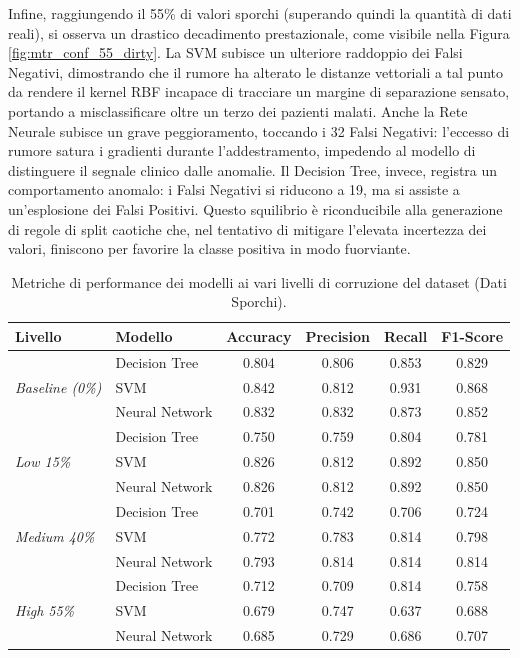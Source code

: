\documentclass[12pt]{article}
\begin{document}
Infine, raggiungendo il 55\% di valori sporchi (superando quindi la quantità di dati reali), si osserva un drastico decadimento prestazionale, come visibile nella Figura \ref{fig:mtr_conf_55_dirty}. La SVM subisce un ulteriore raddoppio dei Falsi Negativi, dimostrando che il rumore ha alterato le distanze vettoriali a tal punto da rendere il kernel RBF incapace di tracciare un margine di separazione sensato, portando a misclassificare oltre un terzo dei pazienti malati. Anche la Rete Neurale subisce un grave peggioramento, toccando i 32 Falsi Negativi: l'eccesso di rumore satura i gradienti durante l'addestramento, impedendo al modello di distinguere il segnale clinico dalle anomalie. Il Decision Tree, invece, registra un comportamento anomalo: i Falsi Negativi si riducono a 19, ma si assiste a un'esplosione dei Falsi Positivi. Questo squilibrio è riconducibile alla generazione di regole di split caotiche che, nel tentativo di mitigare l'elevata incertezza dei valori, finiscono per favorire la classe positiva in modo fuorviante.\\


\begin{table}[ht]
\centering
\begin{tabular}{llcccc}
\toprule
\textbf{Livello} & \textbf{Modello} & \textbf{Accuracy} & \textbf{Precision} & \textbf{Recall} & \textbf{F1-Score} \\
\midrule
\multirow{3}{*}{\textit{Baseline (0\%)}} & Decision Tree  & 0.804 & 0.806 & 0.853 & 0.829 \\
                                         & SVM            & 0.842 & 0.812 & 0.931 & 0.868 \\
                                         & Neural Network & 0.832 & 0.832 & 0.873 & 0.852 \\
\midrule
\multirow{3}{*}{\textit{Low 15\%}}       & Decision Tree  & 0.750 & 0.759 & 0.804 & 0.781 \\
                                         & SVM            & 0.826 & 0.812 & 0.892 & 0.850 \\
                                         & Neural Network & 0.826 & 0.812 & 0.892 & 0.850 \\
\midrule
\multirow{3}{*}{\textit{Medium 40\%}}    & Decision Tree  & 0.701 & 0.742 & 0.706 & 0.724 \\
                                         & SVM            & 0.772 & 0.783 & 0.814 & 0.798 \\
                                         & Neural Network & 0.793 & 0.814 & 0.814 & 0.814 \\
\midrule
\multirow{3}{*}{\textit{High 55\%}}      & Decision Tree  & 0.712 & 0.709 & 0.814 & 0.758 \\
                                         & SVM            & 0.679 & 0.747 & 0.637 & 0.688 \\
                                         & Neural Network & 0.685 & 0.729 & 0.686 & 0.707 \\
\bottomrule
\end{tabular}
\caption{Metriche di performance dei modelli ai vari livelli di corruzione del dataset (Dati Sporchi).}
\label{tab:metriche_sporchi}
\end{table}
\end{document}
